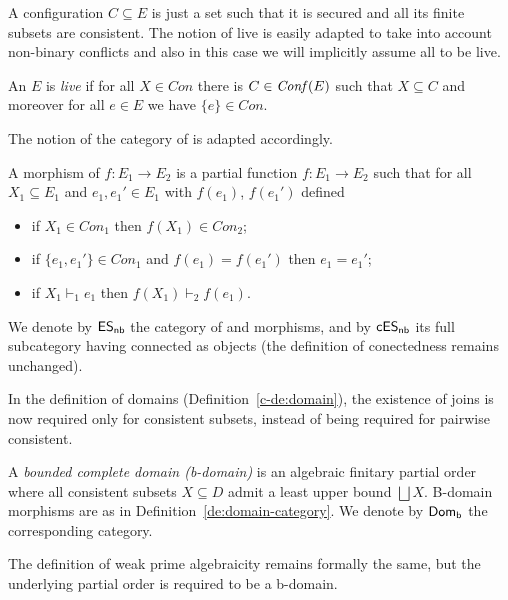 A configuration $C \subseteq E$ is just a set such that
it is secured and all its finite subsets are consistent.
%
The notion of live {\esnabbr} is easily adapted to take into account
non-binary conflicts and also in this case we will implicitly assume
all {\esnabbr} to be live.

\begin{definition}
  An {\esnabbr} ${E}$ is \emph{live} if for all
  $X \in Con$ there is $C \in \mathit{Conf}({E})$ such that
  $X \subseteq C$ and moreover
  for all $e \in E$ we have $\{ e \} \in  Con$.
\end{definition}


The notion of the category of {\esnabbr} is adapted accordingly.

\begin{definition}
  \label{a-de:es-morphism}
  A morphism of {\esnabbr} $f : {E}_1 \to {E}_2$ is a partial
  function $f : E_1 \to E_2$ such that
  for all $X_1 \subseteq E_1$ and $e_1, e_1' \in E_1$ with $f(e_1)$, $f(e_1')$ defined
  \begin{itemize}
  \item if $X_1 \in Con_1$ then $f(X_1) \in Con_2$;
  \item if $\{ e_1, e_1' \} \in Con_1$ and $f(e_1) = f(e_1')$ then $e_1 = e_1'$;
  \item if $X_1 \vdash_1 e_1$ then 
  $f(X_1) \vdash_2 f(e_1)$.
  \end{itemize}
  We denote by $\mathsf{ES_{nb}}$ the category of {\esnabbr} and {\esnabbr} morphisms,
  and by $\mathsf{cES_{nb}}$ its full subcategory having connected {\esnabbr} as objects (the definition of conectedness remains unchanged).
\end{definition}

In the definition of domains (Definition~\ref{c-de:domain}), the
existence of joins is now required only for consistent subsets,
instead of being required for pairwise consistent.

\begin{definition}[b-domains]
  \label{de:domain}
  A \emph{bounded complete domain (b-domain)} is an algebraic
  finitary partial order where all consistent subsets $X \subseteq D$
  admit a least upper bound $\bigsqcup X$.
  B-domain morphisms are as in Definition~\ref{de:domain-category}. 
  We denote by $\mathsf{Dom_b}$ the corresponding category.
\end{definition}

%
The definition of weak prime algebraicity remains formally the same, 
but the underlying partial order is required to be a b-domain.


